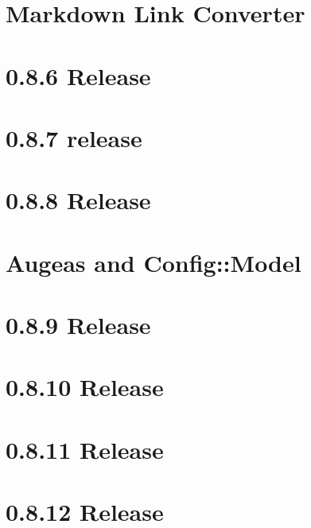 \documentclass[twoside]{book}
\newcommand{\+}{\discretionary{\mbox{\scriptsize$\hookleftarrow$}}{}{}}
\begin{document}
\chapter{Markdown Link Converter}
\label{doc_markdownlinkconverter_README_md}

\chapter{0.8.6 Release}
\label{doc_news_2014-06-21_0_8_6_md}

\chapter{0.8.7 release}
\label{doc_news_2014-07-28_0_8_7_md}

\chapter{0.8.8 Release}
\label{doc_news_2014-09-02_0_8_8_md}

\chapter{Augeas and Config\+:\+:Model}
\label{doc_news_2014-10-22_augeas_md}

\chapter{0.8.9 Release}
\label{doc_news_2014-11-04_0_8_9_md}

\chapter{0.8.10 Release}
\label{doc_news_2014-12-02_0_8_10_md}

\chapter{0.8.11 Release}
\label{doc_news_2015-04-03_0_8_11_md}

\chapter{0.8.12 Release}
\label{doc_news_2015-07-13_0_8_12_md}

\end{document}

